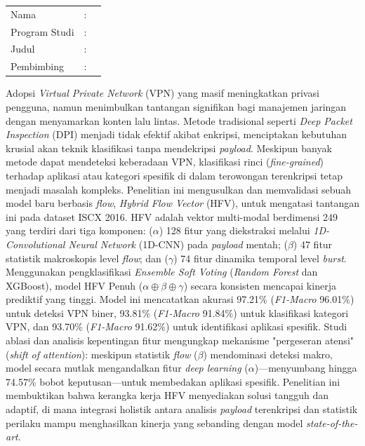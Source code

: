 %
%
%
\vspace*{0.2cm}
    \singlespacing
	\setlength{\parindent}{0pt}
	
	\begin{tabular}{@{}l l p{10cm}}
		Nama&: & \penulis \\
		Program Studi&: & \program \\
		Judul&: & \judul \\
		Pembimbing&: & \pembimbing \\
	\end{tabular}

	\bigskip
	\bigskip

Adopsi \textit{Virtual Private Network} (VPN) yang masif meningkatkan privasi pengguna, namun menimbulkan tantangan signifikan bagi manajemen jaringan dengan menyamarkan konten lalu lintas. Metode tradisional seperti \textit{Deep Packet Inspection} (DPI) menjadi tidak efektif akibat enkripsi, menciptakan kebutuhan krusial akan teknik klasifikasi tanpa mendekripsi \textit{payload}. Meskipun banyak metode dapat mendeteksi keberadaan VPN, klasifikasi rinci (\textit{fine-grained}) terhadap aplikasi atau kategori spesifik di dalam terowongan terenkripsi tetap menjadi masalah kompleks. Penelitian ini mengusulkan dan memvalidasi sebuah model baru berbasis \textit{flow}, \textit{Hybrid Flow Vector} (HFV), untuk mengatasi tantangan ini pada dataset ISCX 2016. HFV adalah vektor multi-modal berdimensi 249 yang terdiri dari tiga komponen: ($\alpha$) 128 fitur yang diekstraksi melalui \textit{1D-Convolutional Neural Network} (1D-CNN) pada \textit{payload} mentah; ($\beta$) 47 fitur statistik makroskopis level \textit{flow}; dan ($\gamma$) 74 fitur dinamika temporal level \textit{burst}. Menggunakan pengklasifikasi \textit{Ensemble Soft Voting} (\textit{Random Forest} dan XGBoost), model HFV Penuh ($\alpha \oplus \beta \oplus \gamma$) secara konsisten mencapai kinerja prediktif yang tinggi. Model ini mencatatkan akurasi 97.21\% (\textit{F1-Macro} 96.01\%) untuk deteksi VPN biner, 93.81\% (\textit{F1-Macro} 91.84\%) untuk klasifikasi kategori VPN, dan 93.70\% (\textit{F1-Macro} 91.62\%) untuk identifikasi aplikasi spesifik. Studi ablasi dan analisis kepentingan fitur mengungkap mekanisme "pergeseran atensi" (\textit{shift of attention}): meskipun statistik \textit{flow} ($\beta$) mendominasi deteksi makro, model secara mutlak mengandalkan fitur \textit{deep learning} ($\alpha$)—menyumbang hingga 74.57\% bobot keputusan—untuk membedakan aplikasi spesifik. Penelitian ini membuktikan bahwa kerangka kerja HFV menyediakan solusi tangguh dan adaptif, di mana integrasi holistik antara analisis \textit{payload} terenkripsi dan statistik perilaku mampu menghasilkan kinerja yang sebanding dengan model \textit{state-of-the-art}.



